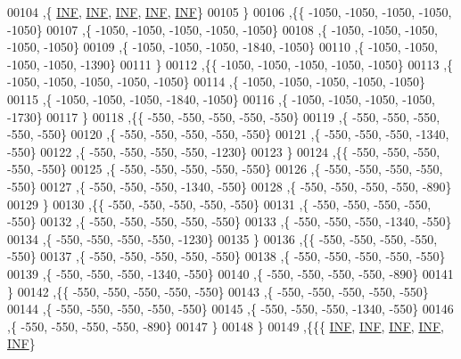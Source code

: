 \begin{DoxyCode}
00104   ,\{   \mbox{\hyperlink{1_88_84__epars_8h_a12c2040f25d8e3a7b9e1c2024c618cb6}{INF}},   \mbox{\hyperlink{1_88_84__epars_8h_a12c2040f25d8e3a7b9e1c2024c618cb6}{INF}},   \mbox{\hyperlink{1_88_84__epars_8h_a12c2040f25d8e3a7b9e1c2024c618cb6}{INF}},   \mbox{\hyperlink{1_88_84__epars_8h_a12c2040f25d8e3a7b9e1c2024c618cb6}{INF}},   \mbox{\hyperlink{1_88_84__epars_8h_a12c2040f25d8e3a7b9e1c2024c618cb6}{INF}}\}
00105   \}
00106  ,\{\{ -1050, -1050, -1050, -1050, -1050\}
00107   ,\{ -1050, -1050, -1050, -1050, -1050\}
00108   ,\{ -1050, -1050, -1050, -1050, -1050\}
00109   ,\{ -1050, -1050, -1050, -1840, -1050\}
00110   ,\{ -1050, -1050, -1050, -1050, -1390\}
00111   \}
00112  ,\{\{ -1050, -1050, -1050, -1050, -1050\}
00113   ,\{ -1050, -1050, -1050, -1050, -1050\}
00114   ,\{ -1050, -1050, -1050, -1050, -1050\}
00115   ,\{ -1050, -1050, -1050, -1840, -1050\}
00116   ,\{ -1050, -1050, -1050, -1050, -1730\}
00117   \}
00118  ,\{\{  -550,  -550,  -550,  -550,  -550\}
00119   ,\{  -550,  -550,  -550,  -550,  -550\}
00120   ,\{  -550,  -550,  -550,  -550,  -550\}
00121   ,\{  -550,  -550,  -550, -1340,  -550\}
00122   ,\{  -550,  -550,  -550,  -550, -1230\}
00123   \}
00124  ,\{\{  -550,  -550,  -550,  -550,  -550\}
00125   ,\{  -550,  -550,  -550,  -550,  -550\}
00126   ,\{  -550,  -550,  -550,  -550,  -550\}
00127   ,\{  -550,  -550,  -550, -1340,  -550\}
00128   ,\{  -550,  -550,  -550,  -550,  -890\}
00129   \}
00130  ,\{\{  -550,  -550,  -550,  -550,  -550\}
00131   ,\{  -550,  -550,  -550,  -550,  -550\}
00132   ,\{  -550,  -550,  -550,  -550,  -550\}
00133   ,\{  -550,  -550,  -550, -1340,  -550\}
00134   ,\{  -550,  -550,  -550,  -550, -1230\}
00135   \}
00136  ,\{\{  -550,  -550,  -550,  -550,  -550\}
00137   ,\{  -550,  -550,  -550,  -550,  -550\}
00138   ,\{  -550,  -550,  -550,  -550,  -550\}
00139   ,\{  -550,  -550,  -550, -1340,  -550\}
00140   ,\{  -550,  -550,  -550,  -550,  -890\}
00141   \}
00142  ,\{\{  -550,  -550,  -550,  -550,  -550\}
00143   ,\{  -550,  -550,  -550,  -550,  -550\}
00144   ,\{  -550,  -550,  -550,  -550,  -550\}
00145   ,\{  -550,  -550,  -550, -1340,  -550\}
00146   ,\{  -550,  -550,  -550,  -550,  -890\}
00147   \}
00148  \}
00149 ,\{\{\{   \mbox{\hyperlink{1_88_84__epars_8h_a12c2040f25d8e3a7b9e1c2024c618cb6}{INF}},   \mbox{\hyperlink{1_88_84__epars_8h_a12c2040f25d8e3a7b9e1c2024c618cb6}{INF}},   \mbox{\hyperlink{1_88_84__epars_8h_a12c2040f25d8e3a7b9e1c2024c618cb6}{INF}},   \mbox{\hyperlink{1_88_84__epars_8h_a12c2040f25d8e3a7b9e1c2024c618cb6}{INF}},   \mbox{\hyperlink{1_88_84__epars_8h_a12c2040f25d8e3a7b9e1c2024c618cb6}{INF}}\}

\end{DoxyCode}
